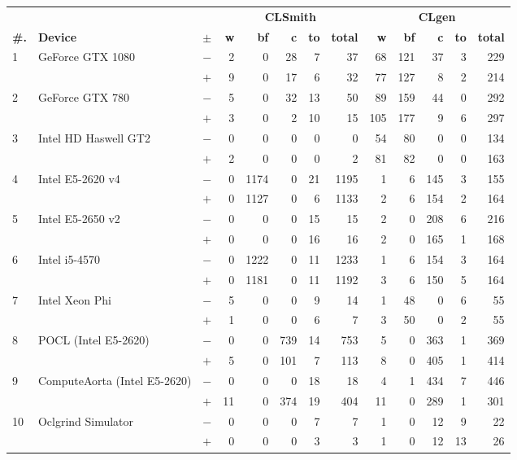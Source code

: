 \begin{tabular}{lll | rrrrr | rrrrr }
  \toprule
  & & & \multicolumn{5}{c|}{\textbf{CLSmith}} & \multicolumn{5}{c}{\textbf{CLgen}} \\
  \textbf{\#.} & \textbf{Device} & $\pm$ &
  \textbf{w} & \textbf{bf} & \textbf{c} & \textbf{to} & \textbf{total} &
  \textbf{w} & \textbf{bf} & \textbf{c} & \textbf{to} & \textbf{total} \\
  \midrule
  \multirow{ 2}{*}{1} & \multirow{ 2}{*}{GeForce GTX 1080} & $-$ & 2 & 0 & 28 & 7 & 37       & 68 & 121 & 37 & 3 & 229 \\& & $+$ & 9 & 0 & 17 & 6 & 32 & 77 & 127 & 8 & 2 & 214 \\
\hline
\multirow{ 2}{*}{2} & \multirow{ 2}{*}{GeForce GTX 780} & $-$ & 5 & 0 & 32 & 13 & 50       & 89 & 159 & 44 & 0 & 292 \\& & $+$ & 3 & 0 & 2 & 10 & 15 & 105 & 177 & 9 & 6 & 297 \\
\hline
\multirow{ 2}{*}{3} & \multirow{ 2}{*}{Intel HD Haswell GT2} & $-$ & 0 & 0 & 0 & 0 & 0       & 54 & 80 & 0 & 0 & 134 \\& & $+$ & 2 & 0 & 0 & 0 & 2 & 81 & 82 & 0 & 0 & 163 \\
\hline
\multirow{ 2}{*}{4} & \multirow{ 2}{*}{Intel E5-2620 v4} & $-$ & 0 & 1174 & 0 & 21 & 1195       & 1 & 6 & 145 & 3 & 155 \\& & $+$ & 0 & 1127 & 0 & 6 & 1133 & 2 & 6 & 154 & 2 & 164 \\
\hline
\multirow{ 2}{*}{5} & \multirow{ 2}{*}{Intel E5-2650 v2} & $-$ & 0 & 0 & 0 & 15 & 15       & 2 & 0 & 208 & 6 & 216 \\& & $+$ & 0 & 0 & 0 & 16 & 16 & 2 & 0 & 165 & 1 & 168 \\
\hline
\multirow{ 2}{*}{6} & \multirow{ 2}{*}{Intel i5-4570} & $-$ & 0 & 1222 & 0 & 11 & 1233       & 1 & 6 & 154 & 3 & 164 \\& & $+$ & 0 & 1181 & 0 & 11 & 1192 & 3 & 6 & 150 & 5 & 164 \\
\hline
\multirow{ 2}{*}{7} & \multirow{ 2}{*}{Intel Xeon Phi} & $-$ & 5 & 0 & 0 & 9 & 14       & 1 & 48 & 0 & 6 & 55 \\& & $+$ & 1 & 0 & 0 & 6 & 7 & 3 & 50 & 0 & 2 & 55 \\
\hline
\multirow{ 2}{*}{8} & \multirow{ 2}{*}{POCL (Intel E5-2620)} & $-$ & 0 & 0 & 739 & 14 & 753       & 5 & 0 & 363 & 1 & 369 \\& & $+$ & 5 & 0 & 101 & 7 & 113 & 8 & 0 & 405 & 1 & 414 \\
\hline
\multirow{ 2}{*}{9} & \multirow{ 2}{*}{ComputeAorta (Intel E5-2620)} & $-$ & 0 & 0 & 0 & 18 & 18       & 4 & 1 & 434 & 7 & 446 \\& & $+$ & 11 & 0 & 374 & 19 & 404 & 11 & 0 & 289 & 1 & 301 \\
\hline
\multirow{ 2}{*}{10} & \multirow{ 2}{*}{Oclgrind Simulator} & $-$ & 0 & 0 & 0 & 7 & 7       & 1 & 0 & 12 & 9 & 22 \\& & $+$ & 0 & 0 & 0 & 3 & 3 & 1 & 0 & 12 & 13 & 26 \\
  \bottomrule
\end{tabular}

